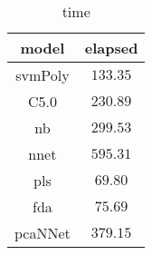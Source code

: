 \begin{table}[!ht]
	\centering
	\begin{tabular}{|c|c|}
		\hline
		model & elapsed \\ \hline
		svmPoly & $133.35$ \\ \hline
		C5.0 & $230.89$ \\ \hline
		nb & $299.53$ \\ \hline
		nnet & $595.31$ \\ \hline
		pls & $69.80$ \\ \hline
		fda & $75.69$ \\ \hline
		pcaNNet & $379.15$ \\ \hline
	\end{tabular}
	\caption{time}
	\label{tab:time}
\end{table}
